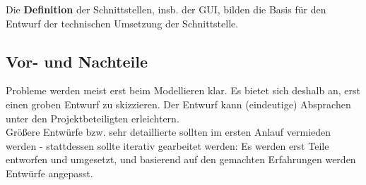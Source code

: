 \noindent
Die \textbf{Definition} der Schnittstellen, insb. der GUI, bilden die Basis für den Entwurf der technischen Umsetzung der Schnittstelle.

\subsection*{Vor- und Nachteile}
Probleme werden meist erst beim Modellieren klar.
Es bietet sich deshalb an, erst einen groben Entwurf zu skizzieren.
Der Entwurf kann (eindeutige) Absprachen unter den Projektbeteiligten erleichtern.\\

\noindent
Größere Entwürfe bzw. sehr detaillierte sollten im ersten Anlauf vermieden werden - stattdessen sollte iterativ gearbeitet werden: Es werden erst Teile entworfen und umgesetzt, und basierend auf den gemachten Erfahrungen werden Entwürfe angepasst.


